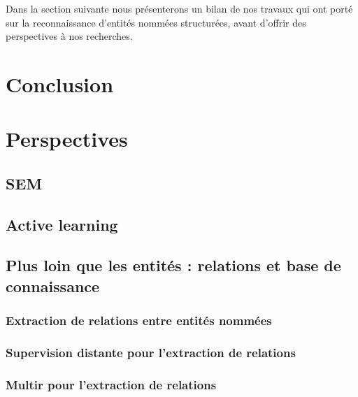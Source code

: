 \documentclass[12pt,a4paper,times,twoside,openright]{report}
\begin{document}
Dans la section suivante nous présenterons un bilan de nos travaux qui ont porté sur la reconnaissance d'entités nommées structurées, avant d'offrir des perspectives à nos recherches.

\section{Conclusion}
\label{sec:phd-conclusion}



\section{Perspectives}
    
    \subsection{SEM}
    \label{subsec:perspectives-SEM}
    
    
    \subsection{Active learning}
    \label{subsec:perspectives-active-learning}
    

    \subsection{Plus loin que les entités : relations et base de connaissance}
    
        
        \subsubsection{Extraction de relations entre entités nommées}
        
        
        \subsubsection{Supervision distante pour l'extraction de relations}
        \label{subsec:multir-distant-supervision}
        
        
        \subsubsection{Multir pour l'extraction de relations}
        \label{subsec:imm-multir}
        
            
\end{document}
